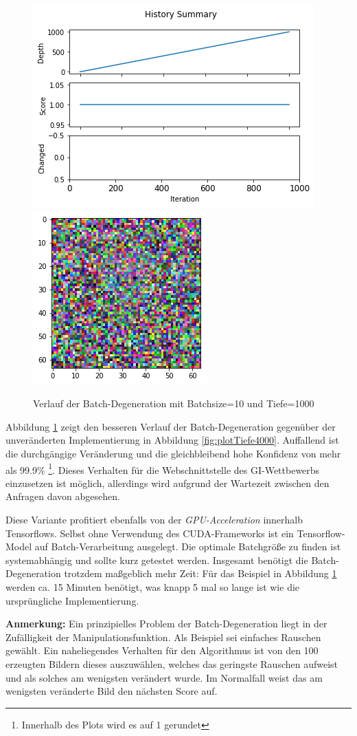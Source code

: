 \begin{figure}[h]
	\centering
	\includegraphics[width=0.5\linewidth]{Images/DegenSamples/BatchDegPlotTiefe1000}
	\includegraphics[width=0.35\linewidth]{Images/DegenSamples/BatchDegTiefe1000}
	\caption[Batch-Degeneration-Plot]{Verlauf der Batch-Degeneration mit Batchsize=10 und Tiefe=1000}
	\label{fig:batchdegplottiefe1000}
\end{figure}

Abbildung \ref{fig:batchdegplottiefe1000} zeigt den besseren Verlauf der Batch-Degeneration gegenüber der unveränderten Implementierung in Abbildung \ref{fig:plotTiefe4000}. 
Auffallend ist die durchgängige Veränderung und die gleichbleibend hohe Konfidenz von mehr als 99.9\% \footnote{Innerhalb des Plots wird es auf 1 gerundet}. 
Dieses Verhalten für die Webschnittstelle des \ac{GI}-Wettbewerbs einzusetzen ist möglich, allerdings wird aufgrund der Wartezeit zwischen den Anfragen davon abgesehen. 

Diese Variante profitiert ebenfalls von der \textit{GPU-Acceleration} innerhalb Tensorflows. 
Selbst ohne Verwendung des CUDA-Frameworks ist ein Tensorflow-Model auf Batch-Verarbeitung ausgelegt. 
Die optimale Batchgröße zu finden ist systemabhängig und sollte kurz getestet werden. 
Insgesamt benötigt die Batch-Degeneration trotzdem maßgeblich mehr Zeit: 
Für das Beispiel in Abbildung \ref{fig:batchdegplottiefe1000} werden ca. 15 Minuten benötigt, was knapp 5 mal so lange ist wie die ursprüngliche Implementierung. 

\textbf{Anmerkung:} Ein prinzipielles Problem der Batch-Degeneration liegt in der Zufälligkeit der Manipulationsfunktion. 
Als Beispiel sei einfaches Rauschen gewählt. 
Ein naheliegendes Verhalten für den Algorithmus ist von den 100 erzeugten Bildern dieses auszuwählen, welches das geringste Rauschen aufweist und als solches am wenigsten verändert wurde. 
Im Normalfall weist das am wenigsten veränderte Bild den nächsten Score auf. 


